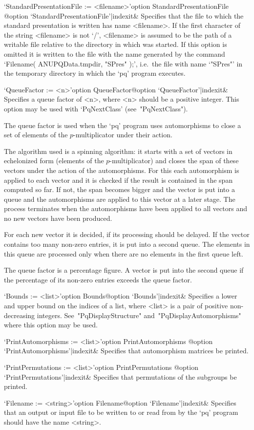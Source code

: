 \>`StandardPresentationFile := <filename>'{option StandardPresentationFile}%
@{option `StandardPresentationFile'|indexit}&
Specifies that the file to which the standard presentation is written has
name <filename>. If the first character of the string <filename>  is  not
`/', <filename> is assumed to be the path of a writable file relative  to
the directory in which {\GAP} was started. If this option is  omitted  it
is written to the file with the name generated by the command  `Filename(
ANUPQData.tmpdir, "SPres" );', i.e.~the file with name `"SPres"'  in  the
temporary directory in which the `pq' program executes.

\>`QueueFactor := <n>'{option QueueFactor}@{option `QueueFactor'|indexit}&
Specifies a queue factor of <n>, where <n> should be a positive  integer.
This option may be used with `PqNextClass' (see~"PqNextClass").

The queue factor is used when the `pq' program uses automorphisms to close
a set of elements of the $p$-multiplicator under their action.

The algorithm used is a spinning algorithm:  it  starts  with  a  set  of
vectors in echelonized  form  (elements  of  the  $p$-multiplicator)  and
closes the span of these vectors under the action of  the  automorphisms.
For this each automorphism is applied to each vector and it is checked if
the result is contained in the span computed so far.  If  not,  the  span
becomes bigger and the vector is put into a queue and  the  automorphisms
are applied to this vector at a later stage. The process terminates  when
the automorphisms have been applied to all vectors  and  no  new  vectors
have been produced.

For each new vector it is decided, if its processing should  be  delayed.
If the vector contains too many non-zero entries, it is put into a second
queue. The elements in this queue are processed only when  there  are  no
elements in the first queue left.

The queue factor is a percentage figure. A vector is put into the  second
queue if the percentage of its non-zero entries exceeds the queue factor.

\>`Bounds := <list>'{option Bounds}@{option `Bounds'|indexit}&
Specifies a lower and upper bound on the indices of a list, where  <list>
is a pair of positive non-decreasing  integers.  See~"PqDisplayStructure"
and~"PqDisplayAutomorphisms" where this option may be used.

\>`PrintAutomorphisms := <list>'{option PrintAutomorphisms}%
@{option `PrintAutomorphisms'|indexit}&
Specifies that automorphism matrices be printed.

\>`PrintPermutations := <list>'{option PrintPermutations}%
@{option `PrintPermutations'|indexit}&
Specifies that permutations of the subgroups be printed.

\>`Filename := <string>'{option Filename}@{option `Filename'|indexit}&
Specifies that an output or input file to be written to or read  from  by
the `pq' program should have the name <string>.

\enditems

